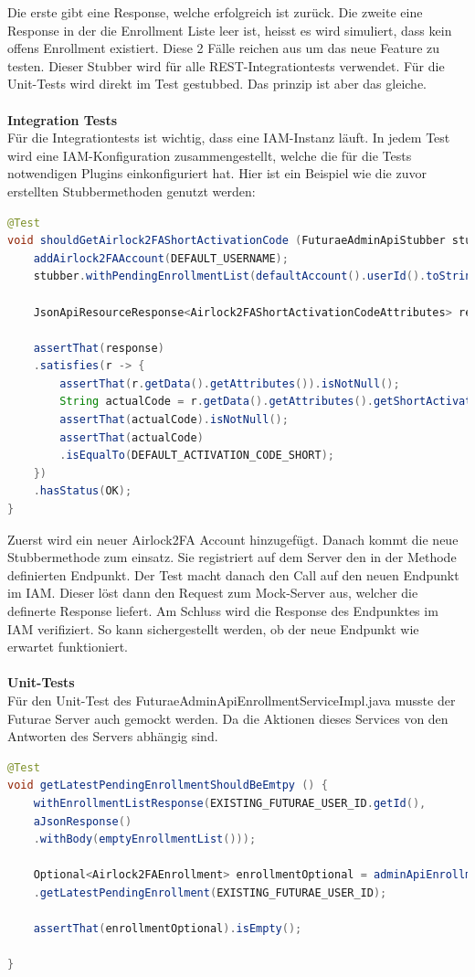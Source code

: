 Die erste gibt eine Response, welche erfolgreich ist zurück. Die zweite eine Response in der die Enrollment Liste leer ist, heisst es wird simuliert, dass kein offens Enrollment existiert. Diese 2 Fälle reichen aus um das neue Feature zu testen.
Dieser Stubber wird für alle REST-Integrationtests verwendet. Für die Unit-Tests wird direkt im Test gestubbed. Das prinzip ist aber das gleiche.\\\\
\textbf{Integration Tests}\\
Für die Integrationtests ist wichtig, dass eine IAM-Instanz läuft. In jedem Test wird eine IAM-Konfiguration zusammengestellt, welche die für die Tests notwendigen Plugins einkonfiguriert hat.
Hier ist ein Beispiel wie die zuvor erstellten Stubbermethoden genutzt werden:
 
\begin{lstlisting}[language=Java]
@Test
void shouldGetAirlock2FAShortActivationCode (FuturaeAdminApiStubber stubber) {
	addAirlock2FAAccount(DEFAULT_USERNAME);
	stubber.withPendingEnrollmentList(defaultAccount().userId().toString(), 1);
	
	JsonApiResourceResponse<Airlock2FAShortActivationCodeAttributes> response = getAirlock2FAShortActivationCode(DEFAULT_USERNAME);
	
	assertThat(response)
	.satisfies(r -> {
		assertThat(r.getData().getAttributes()).isNotNull();
		String actualCode = r.getData().getAttributes().getShortActivationCode();
		assertThat(actualCode).isNotNull();
		assertThat(actualCode)
		.isEqualTo(DEFAULT_ACTIVATION_CODE_SHORT);
	})
	.hasStatus(OK);
}
\end{lstlisting}
Zuerst wird ein neuer Airlock2FA Account hinzugefügt. Danach kommt die neue Stubbermethode zum einsatz. Sie registriert auf dem Server den in der Methode definierten Endpunkt. Der Test macht danach den Call auf den neuen Endpunkt im IAM. Dieser löst dann den Request zum Mock-Server aus, welcher die definerte Response liefert. Am Schluss wird die Response des Endpunktes im IAM verifiziert. So kann sichergestellt werden, ob der neue Endpunkt wie erwartet funktioniert.\\
\\
\textbf{Unit-Tests}\\
Für den Unit-Test des FuturaeAdminApiEnrollmentServiceImpl.java musste der Futurae Server auch gemockt werden. Da die Aktionen dieses Services von den Antworten des Servers abhängig sind.
\begin{lstlisting}[language=Java]
@Test
void getLatestPendingEnrollmentShouldBeEmtpy () {
	withEnrollmentListResponse(EXISTING_FUTURAE_USER_ID.getId(),
	aJsonResponse()
	.withBody(emptyEnrollmentList()));
	
	Optional<Airlock2FAEnrollment> enrollmentOptional = adminApiEnrollmentService()
	.getLatestPendingEnrollment(EXISTING_FUTURAE_USER_ID);
	
	assertThat(enrollmentOptional).isEmpty();
	
}
\end{lstlisting}
